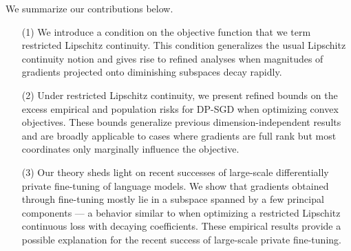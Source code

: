 We summarize our contributions below.
\begin{itemize}[leftmargin=7mm]
\setlength\itemsep{0.1em}
	\item [(1)] We introduce a condition on the objective function that we term restricted Lipschitz continuity.
		This condition generalizes the usual Lipschitz continuity notion and gives rise to refined analyses when magnitudes of gradients projected onto diminishing subspaces decay rapidly.
	\item [(2)] Under restricted Lipschitz continuity, we present refined bounds on the excess empirical and population risks for DP-SGD when optimizing convex objectives. These bounds generalize previous dimension-independent results~\citep{song2021evading} and are broadly applicable to cases where gradients are full rank but most coordinates only marginally influence the objective.
	\item [(3)] Our theory sheds light on recent successes of large-scale differentially private fine-tuning of language models.
		We show that gradients obtained through fine-tuning mostly lie in a subspace spanned by a few principal components --- a behavior similar to when optimizing a restricted Lipschitz continuous loss with decaying coefficients.
		These empirical results provide a possible explanation for the recent success of large-scale private fine-tuning.
\end{itemize}
